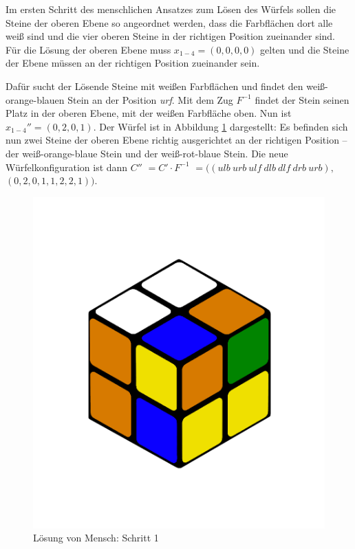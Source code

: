\documentclass[12pt,a4paper, usenames, dvipsnames]{article}
\theoremstyle{mystyle}
\theoremstyle{definition}
\begin{document}
Im ersten Schritt des menschlichen Ansatzes zum Lösen des Würfels sollen die Steine der oberen Ebene so angeordnet werden, dass die Farbflächen dort alle weiß sind und die vier oberen Steine in der richtigen Position zueinander sind. 
Für die Lösung der oberen Ebene muss $x_{1-4} = (0,0,0,0)$ gelten und die Steine der Ebene müssen an der richtigen Position zueinander sein.

Dafür sucht der Lösende Steine mit weißen Farbflächen und findet den weiß-orange-blauen Stein an der Position \textit{urf}. 
Mit dem Zug $F^{-1}$ findet der Stein seinen Platz in der oberen Ebene, mit der weißen Farbfläche oben. 
Nun ist $x_{1-4}''=(0,2,0,1)$. Der Würfel ist in Abbildung \ref{Abbildung_LösungMensch1} dargestellt: Es befinden sich nun zwei Steine der oberen Ebene richtig ausgerichtet an der richtigen Position -- der weiß-orange-blaue Stein und der weiß-rot-blaue Stein. Die neue Würfelkonfiguration ist dann $C'' $ $= C' \cdot F^{-1} $ $= ((\textit{ulb} \ \textit{urb} \ \textit{ulf} \ \textit{dlb} \ \textit{dlf} \ \textit{drb} \ \textit{urb}),$ $(0,2,0,1,1,2,2,1))$.

\begin{figure}[H]
\centering
\includegraphics[scale=0.12]{0201.png}
\caption[Lösung von Mensch: Schritt 1]{Lösung von Mensch: Schritt 1}
\label{Abbildung_LösungMensch1}
\end{figure}
\end{document}
